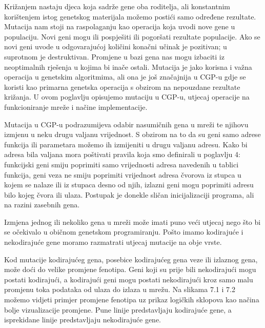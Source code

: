 \quad Križanjem nastaju djeca koja sadrže gene oba roditelja, ali konstantnim korištenjem istog genetskog materijala možemo postići samo određene rezultate. Mutacija nam stoji na raspolaganju kao operacija koja uvodi nove gene u populaciju. Novi geni mogu ili pospješiti ili pogoršati rezultate populacije. Ako se novi geni uvode u odgovarajućoj količini konačni učinak je pozitivan; u suprotnom je destruktivan. Promjene u bazi gena nas mogu izbaciti iz neoptimalnih rješenja u kojima bi inače ostali. Mutacija je jako korisna i važna operacija u genetskim algoritmima, ali ona je još značajnija u CGP-u gdje se koristi kao primarna genetska operacija s obzirom na nepouzdane rezultate križanja. U ovom poglavlju opisujemo mutaciju u CGP-u, utjecaj operacije na funkcioniranje mreže i načine implementacije.
\par 
Mutacija u CGP-u podrazumijeva odabir nasumičnih gena u mreži te njihovu izmjenu u neku drugu valjanu vrijednost. S obzirom na to da su geni samo adrese funkcija ili parametara možemo ih izmijeniti u drugu valjanu adresu. Kako bi adresa bila valjana mora poštivati pravila koja smo definirali u poglavlju 4: funkcijski geni smiju poprimiti samo vrijednosti adresa navedenih u tablici funkcija, geni veza ne smiju poprimiti vrijednost adresa čvorova iz stupca u kojem se nalaze ili iz stupaca desno od njih, izlazni geni mogu poprimiti adresu bilo kojeg čvora ili ulaza. Postupak je donekle sličan inicijalizaciji programa, ali na razini zasebnih gena.
\par 
Izmjena jednog ili nekoliko gena u mreži može imati puno veći utjecaj nego što bi se očekivalo u običnom genetskom programiranju. Pošto imamo kodirajuće i nekodirajuće gene moramo razmatrati utjecaj mutacije na obje vrste.
\par 
 Kod mutacije kodirajućeg gena, posebice kodirajućeg gena veze ili izlaznog gena, može doći do velike promjene fenotipa. Geni koji su prije bili nekodirajući mogu postati kodirajući, a kodirajući geni  mogu postati nekodirajući kroz samo malu promjenu toka podataka od ulaza do izlaza u mrežu. Na slikama 7.1 i 7.2 možemo vidjeti primjer promjene fenotipa uz prikaz logičkih sklopova kao načina bolje vizualizacije promjene. Pune linije predstavljaju kodirajuće gene, a isprekidane linije predstavljaju nekodirajuće gene. 
 
